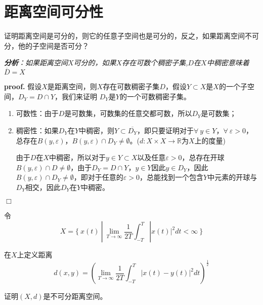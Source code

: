 \section{距离空间可分性}

\begin{mdframed}
    \begin{question}
        证明距离空间是可分的，则它的任意子空间也是可分的，反之，如果距离空间不可分，他的子空间是否可分？
    \end{question}
\end{mdframed}

\textsl{\textbf{分析}：如果距离空间$X$可分的，如果$X$存在可数个稠密子集,$D$在$X$中稠密意味着$\overline{D}=X$}

\textbf{proof.} 假设$X$是距离空间，则$X$存在可数稠密子集$D$，假设$Y\subset X$是$X$的一个子空间，$D_Y=D\cap Y$，我们来证明
$D_Y$是$Y$的一个可数稠密子集。

\begin{enumerate}[itemindent=2em]
    \item 可数性：由于$D$是可数集，可数集的任意交都可数，所以$D_Y$是可数集；
    \item 稠密性：如果$D_Y$在$Y$中稠密，则$Y\subset \overline{D_Y}$，即只要证明对于$\forall\ y\in Y$，$\forall\ \varepsilon>0$，总存在$B(y,\varepsilon)$，$B(y,\varepsilon)\cap D_Y\neq \emptyset$。($d:X\times X\rightarrow \mathbb{R}$为$X$上的度量)
    
    由于$D$在$X$中稠密，所以对于$y\in Y\subset X$以及任意$\varepsilon>0$，总存在开球$B(y,\varepsilon)\cap D\neq \emptyset$，由于$D_Y=D\cap Y$，$y\in Y$因此$y\in D_Y$，因此$B(y,\varepsilon)\cap D_Y\neq \emptyset$，即对于任意的$\varepsilon>0$，总能找到一个包含$Y$中元素的开球与$D_Y$相交，因此$D_Y$在$Y$中稠密。
\end{enumerate}

$\Box$

\begin{mdframed}
    \begin{question}
        令
        \begin{equation}
            X=\{\ x(t)\ |\ \lim_{T\rightarrow \infty}\frac{1}{2T}\int_{-T}^{T}|x(t)|^2dt<\infty \ \}
        \end{equation}

        在$X$上定义距离
        \begin{equation}
            d(x,y)=(\lim_{T\rightarrow \infty}\frac{1}{2T}\int_{-T}^{T}|x(t)-y(t)|^2dt)^{\frac{1}{2}}
        \end{equation}

        证明$(X,d)$是不可分距离空间。
    \end{question}
\end{mdframed}

